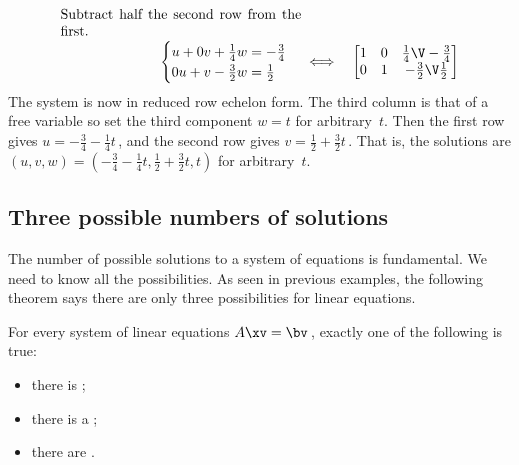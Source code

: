 \begin{example}
\begin{solution}
\begin{eqnarray*}
\\
\parbox{0.5\linewidth}{Subtract half the second row from the first.}
\\
\begin{cases}
u+0v+\frac14w=-\frac34\\0u+v-\frac32w=\frac12
\end{cases}
&\iff&%
\begin{bmatrix} 1&0&\frac14\V-\frac34\\0&1&-\frac32\V\frac12 \end{bmatrix}
\end{eqnarray*}
The system is now in reduced row echelon form.  
The third column is that of a free variable so set the third component \(w=t\) for arbitrary~\(t\).
Then the first row gives \(u=-\frac34-\frac14t\)\,, and the second row gives \(v=\frac12+\frac32t\)\,.
That is, the solutions are \((u,v,w)=(-\frac34-\frac14t,\frac12+\frac32t,t)\) for arbitrary~\(t\).
\end{solution}
\end{example}




\subsection{Three possible numbers of solutions}
\label{sec:3pns}

The number of possible solutions to a system of equations is fundamental.  
We need to know all the possibilities.
As seen in previous examples, the following theorem says there are only three possibilities for linear equations.

\begin{theorem} \label{thm:fred}
For every system of linear equations \(A\xv=\bv\)\,, exactly one of the following is true:
\begin{itemize}
\item there is ;
\item there is a ;
\item there are .
\end{itemize}
\end{theorem}

\begin{comment}
After studying \autoref{sec:svdsgs}, this theorem could alternatively be proved directly from the use of the so-called \idx{singular value decomposition} in solving the linear equation \(A\xv=\bv\)\,.
\end{comment}

